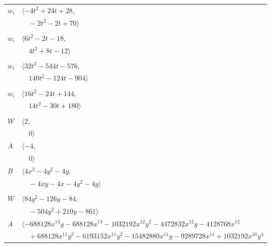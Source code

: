 \documentclass[11pt]{article}
\begin{document}
\begin{longtable}{@{}ll@{}}
$w_i$ & $\langle -4t^{2}+24t+28,$\\
 & $\quad -2t^{2}-2t+70\rangle$\\
\addlinespace[2pt]
\multicolumn{2}{@{}p{0.97\textwidth}@{}}{$i=10$, $D_i=2$, $\rho_{ij}$: $20{:}2, \allowbreak 26{:}1, \allowbreak 33{:}1, \allowbreak 42{:}2, \allowbreak 56{:}1$}\\
$w_i$ & $\langle 6t^{2}-2t-18,$\\
 & $\quad 4t^{2}+8t-12\rangle$\\
\addlinespace[2pt]
\multicolumn{2}{@{}p{0.97\textwidth}@{}}{$i=11$, $D_i=4$, $\rho_{ij}$: $20{:}1, \allowbreak 22{:}1, \allowbreak 25{:}1, \allowbreak 26{:}1, \allowbreak 29{:}2, \allowbreak 39{:}1, \allowbreak 42{:}2, \allowbreak 53{:}2, \allowbreak 59{:}2$}\\
$w_i$ & $\langle 32t^{2}-544t-576,$\\
 & $\quad 140t^{2}-124t-904\rangle$\\
\addlinespace[2pt]
\multicolumn{2}{@{}p{0.97\textwidth}@{}}{$i=12$, $D_i=2$, $\rho_{ij}$: $21{:}1, \allowbreak 28{:}2, \allowbreak 46{:}2, \allowbreak 52{:}2, \allowbreak 58{:}2$}\\
$w_i$ & $\langle 16t^{2}-24t+144,$\\
 & $\quad 14t^{2}-30t+180\rangle$\\
\addlinespace[2pt]
\multicolumn{2}{@{}p{0.97\textwidth}@{}}{$i=13$, $D_i=1$, $\rho_{ij}$: $23{:}1, \allowbreak 35{:}1, \allowbreak 36{:}1$}\\
$W$ & $\langle 2,$\\
 & $\quad 0\rangle$\\
$A$ & $\langle -4,$\\
 & $\quad 0\rangle$\\
$B$ & $\langle 4x^{3}-4y^{2}-4y,$\\
 & $\quad -4xy-4x-4y^{2}-4y\rangle$\\
\addlinespace[2pt]
\multicolumn{2}{@{}p{0.97\textwidth}@{}}{$i=14$, $D_i=32$, $\rho_{ij}$: $25{:}1, \allowbreak 26{:}2, \allowbreak 28{:}1, \allowbreak 31{:}1, \allowbreak 32{:}2, \allowbreak 33{:}2, \allowbreak 35{:}2, \allowbreak 37{:}2, \allowbreak 38{:}1, \allowbreak 42{:}2, \allowbreak 55{:}1$}\\
$W$ & $\langle 84y^{2}-126y-84,$\\
 & $\quad -504y^{2}+210y-861\rangle$\\
$A$ & $\langle -688128x^{13}y-688128x^{13}-1032192x^{12}y^{2}-4472832x^{12}y-4128768x^{12}$\\
 & $\quad +688128x^{11}y^{3}-6193152x^{11}y^{2}-15482880x^{11}y-9289728x^{11}+1032192x^{10}y^{4}$\\

\end{longtable}
\end{document}
